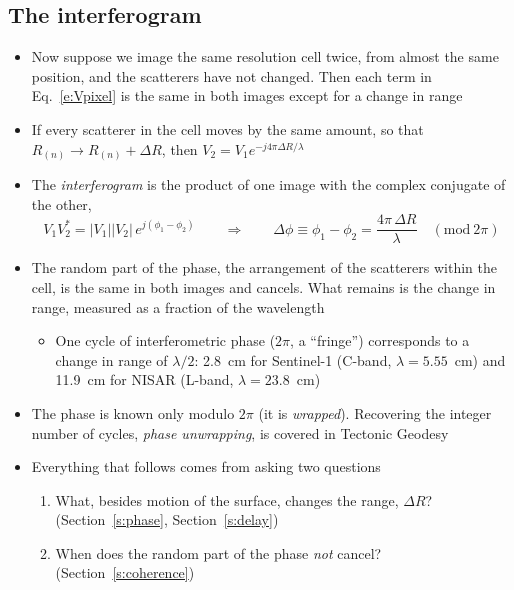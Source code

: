 \documentclass[11pt, oneside]{article}
\begin{document}
\subsection{The interferogram}

\begin{itemize}
	\item Now suppose we image the same resolution cell twice, from almost the same position, and the scatterers have not changed. Then each term in Eq.~\eqref{e:Vpixel} is the same in both images except for a change in range
	\item If every scatterer in the cell moves by the same amount, so that $R_{(n)} \to R_{(n)} + \Delta R$, then $V_2 = V_1e^{-j4\pi\Delta R/\lambda}$
	\item The \emph{interferogram} is the product of one image with the complex conjugate of the other,
	\begin{equation}
		\label{e:ifg}
		V_1V_2^* = |V_1||V_2|\,e^{j(\phi_1 - \phi_2)} \qquad\Rightarrow\qquad \Delta\phi \equiv \phi_1 - \phi_2 = \frac{4\pi\,\Delta R}{\lambda} \quad (\mathrm{mod}\ 2\pi)
	\end{equation}
	\item The random part of the phase, the arrangement of the scatterers within the cell, is the same in both images and cancels. What remains is the change in range, measured as a fraction of the wavelength
	\begin{itemize}
		\item[$\bigstar$] One cycle of interferometric phase ($2\pi$, a ``fringe'') corresponds to a change in range of $\lambda/2$: 2.8~cm for Sentinel-1 (C-band, $\lambda = 5.55$~cm) and 11.9~cm for NISAR (L-band, $\lambda = 23.8$~cm)
	\end{itemize}
	\item The phase is known only modulo $2\pi$ (it is \emph{wrapped}). Recovering the integer number of cycles, \emph{phase unwrapping}, is covered in Tectonic Geodesy
	\item Everything that follows comes from asking two questions
	\begin{enumerate}
		\item What, besides motion of the surface, changes the range, $\Delta R$? (Section~\ref{s:phase}, Section~\ref{s:delay})
		\item When does the random part of the phase \emph{not} cancel? (Section~\ref{s:coherence})
	\end{enumerate}
\end{itemize}
\end{document}
